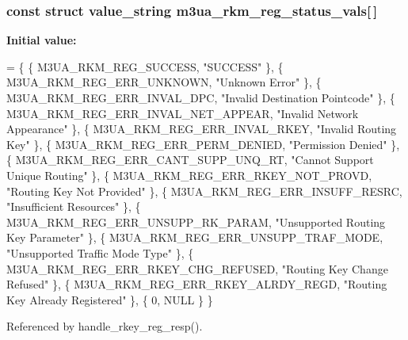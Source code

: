 \subsubsection[{m3ua\+\_\+rkm\+\_\+reg\+\_\+status\+\_\+vals}]{\setlength{\rightskip}{0pt plus 5cm}const struct value\+\_\+string m3ua\+\_\+rkm\+\_\+reg\+\_\+status\+\_\+vals[$\,$]}\label{xua__rkm_8c_a0992bf5538b7f033f634174b1f01dfdd}
{\bfseries Initial value\+:}
\begin{DoxyCode}
= \{
        \{ M3UA_RKM_REG_SUCCESS,                 \textcolor{stringliteral}{"SUCCESS"} \},
        \{ M3UA_RKM_REG_ERR_UNKNOWN,             \textcolor{stringliteral}{"Unknown Error"} \},
        \{ M3UA_RKM_REG_ERR_INVAL_DPC,           \textcolor{stringliteral}{"Invalid Destination Pointcode"} \},
        \{ M3UA_RKM_REG_ERR_INVAL_NET_APPEAR,    \textcolor{stringliteral}{"Invalid Network Appearance"} \},
        \{ M3UA_RKM_REG_ERR_INVAL_RKEY,          \textcolor{stringliteral}{"Invalid Routing Key"} \},
        \{ M3UA_RKM_REG_ERR_PERM_DENIED,         \textcolor{stringliteral}{"Permission Denied"} \},
        \{ M3UA_RKM_REG_ERR_CANT_SUPP_UNQ_RT,    \textcolor{stringliteral}{"Cannot Support Unique Routing"} \},
        \{ M3UA_RKM_REG_ERR_RKEY_NOT_PROVD,      \textcolor{stringliteral}{"Routing Key Not Provided"} \},
        \{ M3UA_RKM_REG_ERR_INSUFF_RESRC,        \textcolor{stringliteral}{"Insufficient Resources"} \},
        \{ M3UA_RKM_REG_ERR_UNSUPP_RK_PARAM,     \textcolor{stringliteral}{"Unsupported Routing Key Parameter"} \},
        \{ M3UA_RKM_REG_ERR_UNSUPP_TRAF_MODE,    \textcolor{stringliteral}{"Unsupported Traffic Mode Type"} \},
        \{ M3UA_RKM_REG_ERR_RKEY_CHG_REFUSED,    \textcolor{stringliteral}{"Routing Key Change Refused"} \},
        \{ M3UA_RKM_REG_ERR_RKEY_ALRDY_REGD,     \textcolor{stringliteral}{"Routing Key Already Registered"} \},
        \{ 0, NULL \}
\}
\end{DoxyCode}


Referenced by handle\+\_\+rkey\+\_\+reg\+\_\+resp().

